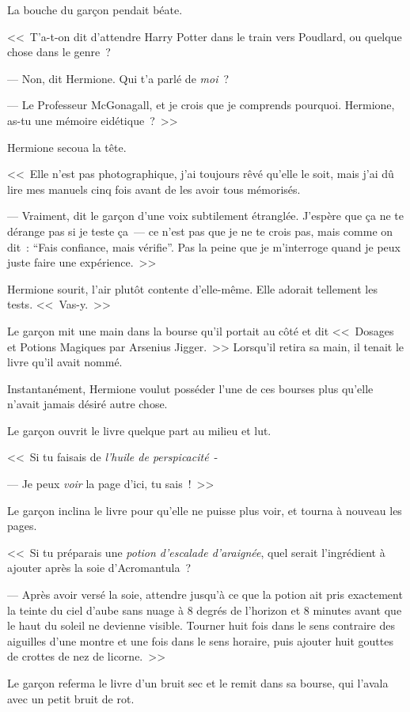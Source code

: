 La bouche du garçon pendait béate.

<<~T'a-t-on dit d'attendre Harry Potter dans le train vers Poudlard, ou quelque chose dans le genre~?

--- Non, dit Hermione. Qui t'a parlé de \emph{moi}~?

--- Le Professeur McGonagall, et je crois que je comprends pourquoi. Hermione, as-tu une mémoire eidétique~?~>>

Hermione secoua la tête.

<<~Elle n'est pas photographique, j'ai toujours rêvé qu'elle le soit, mais j'ai dû lire mes manuels cinq fois avant de les avoir tous mémorisés.

--- Vraiment, dit le garçon d'une voix subtilement étranglée. J'espère que ça ne te dérange pas si je teste ça~— ce n'est pas que je ne te crois pas, mais comme on dit~: “Fais confiance, mais vérifie”. Pas la peine que je m'interroge quand je peux juste faire une expérience.~>>

Hermione sourit, l'air plutôt contente d'elle-même. Elle adorait tellement les tests. <<~Vas-y.~>>

Le garçon mit une main dans la bourse qu'il portait au côté et dit <<~Dosages et Potions Magiques par Arsenius Jigger.~>> Lorsqu'il retira sa main, il tenait le livre qu'il avait nommé.

Instantanément, Hermione voulut posséder l'une de ces bourses plus qu'elle n'avait jamais désiré autre chose.

Le garçon ouvrit le livre quelque part au milieu et lut.

<<~Si tu faisais de \emph{l'huile de perspicacité}~-

--- Je peux \emph{voir} la page d'ici, tu sais~!~>>

Le garçon inclina le livre pour qu'elle ne puisse plus voir, et tourna à nouveau les pages.

<<~Si tu préparais une \emph{potion d'escalade d'araignée}, quel serait l'ingrédient à ajouter après la soie d'Acromantula~?

--- Après avoir versé la soie, attendre jusqu'à ce que la potion ait pris exactement la teinte du ciel d'aube sans nuage à 8 degrés de l'horizon et 8 minutes avant que le haut du soleil ne devienne visible. Tourner huit fois dans le sens contraire des aiguilles d'une montre et une fois dans le sens horaire, puis ajouter huit gouttes de crottes de nez de licorne.~>>

Le garçon referma le livre d'un bruit sec et le remit dans sa bourse, qui l'avala avec un petit bruit de rot.


